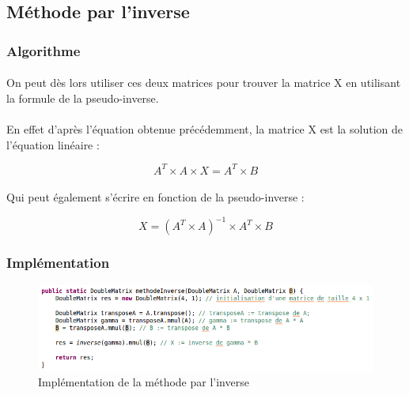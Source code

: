 \documentclass[a4paper,11pt]{article}
\begin{document}
		\subsection{Méthode par l'inverse}

			\subsubsection{Algorithme}

			\paragraph{}
			On peut dès lors utiliser ces deux matrices pour trouver la matrice X en utilisant la formule de la pseudo-inverse.

			\paragraph{}
			En effet d'après l'équation obtenue précédemment, la matrice X est la solution de l'équation linéaire :

			\begin{equation} 
				A^{T} \times A \times X  =  A^{T} \times B
			\end{equation}

			\paragraph{}
			Qui peut également s'écrire en fonction de la pseudo-inverse :

			\begin{equation} 
				X = ( A^{T} \times A)^{-1}  \times  A^{T} \times B
			\end{equation}


			\subsubsection{Implémentation}

			\begin{figure}[h]
				\centerline{\includegraphics[scale=0.50]{img/inverse.png}}
				\caption{Implémentation de la méthode par l'inverse}
				\label{diagramme-composants}
			\end{figure}
\end{document}
